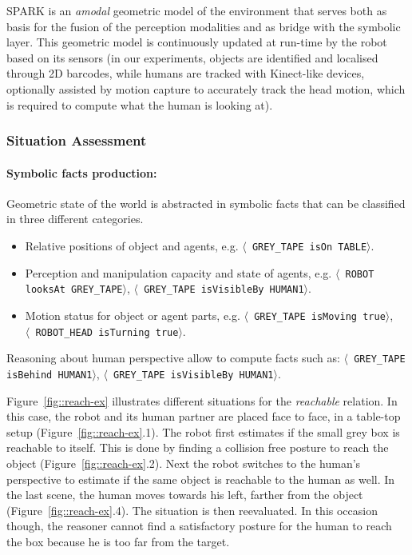 \documentclass[preprint,5p]{elsarticle}
\newcommand{\stmt}[1]{{\footnotesize \tt $\langle$ #1\relax$\rangle$}}
\begin{document}
SPARK is an \emph{amodal} geometric model of the environment that serves both
as basis for the fusion of the perception modalities and as bridge with the
symbolic layer. This geometric model is continuously updated at run-time by the
robot based on its sensors (in our experiments, objects are identified and
localised through 2D barcodes, while humans are tracked with Kinect-like
devices, optionally assisted by motion capture to accurately track the head
motion, which is required to compute what the human is looking at).


\subsubsection{Situation Assessment}

\paragraph{Symbolic facts production:} 

Geometric state of the world is abstracted in symbolic facts that can
be classified in three different categories.

\begin {itemize}
\item Relative positions of object and agents, e.g.  \stmt{GREY\_TAPE
    isOn TABLE}.

\item Perception and manipulation capacity and state of agents,
  e.g. \stmt{ROBOT looksAt GREY\_TAPE}, \stmt{GREY\_TAPE isVisibleBy
    HUMAN1}.

\item Motion status for object or agent parts, e.g.  \stmt{GREY\_TAPE
    isMoving true},\\ \stmt{ROBOT\_HEAD isTurning true}.
\end {itemize} 

Reasoning about human perspective allow to compute facts such as:
\stmt{GREY\_TAPE isBehind HUMAN1}, \stmt{GREY\_TAPE isVisibleBy
  HUMAN1}.

Figure~\ref{fig::reach-ex} illustrates different situations for the
\textit{reachable} relation. In this case, the robot and its human partner
are placed face to face, in a table-top setup (Figure~\ref{fig::reach-ex}.1).
The robot first estimates if the small grey box is reachable to itself. This is
done by finding a collision free posture to reach the object
(Figure~\ref{fig::reach-ex}.2). Next the robot switches to the human's
perspective to estimate if the same object is reachable to the human as well.
In the last scene, the human moves towards his left, farther from the object
(Figure~\ref{fig::reach-ex}.4). The situation is then reevaluated. In this
occasion though, the reasoner cannot find a satisfactory posture for the human
to reach the box because he is too far from the target.
\end{document}
